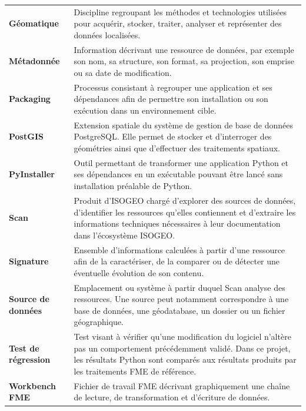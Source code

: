 \begin{longtable}{
    @{}
    >{\bfseries}p{}
    p{}
    @{}
}
Géomatique
&
Discipline regroupant les méthodes et technologies utilisées pour acquérir,
stocker, traiter, analyser et représenter des données localisées.
\\

Métadonnée
&
Information décrivant une ressource de données, par exemple son nom, sa
structure, son format, sa projection, son emprise ou sa date de modification.
\\

Packaging
&
Processus consistant à regrouper une application et ses dépendances afin de
permettre son installation ou son exécution dans un environnement cible.
\\

PostGIS
&
Extension spatiale du système de gestion de base de données PostgreSQL. Elle
permet de stocker et d'interroger des géométries ainsi que d'effectuer des
traitements spatiaux.
\\

PyInstaller
&
Outil permettant de transformer une application Python et ses dépendances en
un exécutable pouvant être lancé sans installation préalable de Python.
\\

Scan
&
Produit d'ISOGEO chargé d'explorer des sources de données, d'identifier les
ressources qu'elles contiennent et d'extraire les informations techniques
nécessaires à leur documentation dans l'écosystème ISOGEO.
\\

Signature
&
Ensemble d'informations calculées à partir d'une ressource afin de la
caractériser, de la comparer ou de détecter une éventuelle évolution de son
contenu.
\\

Source de données
&
Emplacement ou système à partir duquel Scan analyse des ressources. Une source
peut notamment correspondre à une base de données, une géodatabase, un dossier
ou un fichier géographique.
\\

Test de régression
&
Test visant à vérifier qu'une modification du logiciel n'altère pas un
comportement précédemment validé. Dans ce projet, les résultats Python sont
comparés aux résultats produits par les traitements FME de référence.
\\

Workbench FME
&
Fichier de travail FME décrivant graphiquement une chaîne de lecture, de
transformation et d'écriture de données.
\\

\end{longtable}

\normalsize
